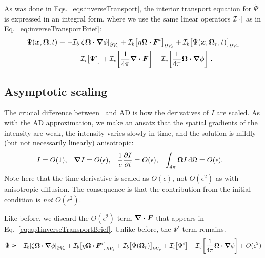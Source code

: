 As was done in Eqs.~\eqref{eqs:inverseTransport}, the interior transport
equation for $\tilde\Psi$ is expressed in an integral form, where we use the
same linear operators $\mathcal{I}_{}\!\left[\cdot\right]$ as in
Eq.~\eqref{eq:inverseTransportBrief}:
\begin{align}\label{eq:ap1inverseTransportBrief}
  \begin{split}
    \tilde\Psi(\bm{x}, \bm{\Omega}, t)
    &\equiv
    -\mathcal{I}_{b}\!\left[\zeta \bm{\Omega}\bm{\cdot} \bm{\nabla} \phi\right]_{\partial V_b}
    +\mathcal{I}_{b}\!\left[\eta \bm{\Omega}\bm{\cdot} \bm{F}^i\right]_{\partial V_b}
    + \mathcal{I}_{b}\!\left[\tilde\Psi(\bm{x}, \bm{\Omega}_r, t)\right]_{\partial V_r}
  \\&\qquad
    + \mathcal{I}_{i}\!\left[\Psi^i\right]
    + \mathcal{I}_{v}\!\left[\frac{1}{4\pi} \bm{\nabla} \bm{\cdot}\bm{F} \right]
    - \mathcal{I}_{v}\!\left[\frac{1}{4\pi} \bm{\Omega}\bm{\cdot} \bm{\nabla} \phi\right]
    \,.
  \end{split}
\end{align}

\subsection{Asymptotic scaling}

The crucial difference between \APone\ and AD is how the derivatives of $I$ are
scaled.
As with the AD approximation, we make an ansatz that the spatial gradients of
the intensity are weak, the intensity varies slowly in time, and the solution is
mildly (but not necessarily linearly) anisotropic:
\begin{align} \label{eq:ap1ansatz}
  I &= O(1), &
  \bm{\nabla} I &= O(\epsilon), &
  \frac{1}{c}\frac{\partial I}{\partial t} &= O(\epsilon), &
  \int_{4\pi} \bm{\Omega} I\mathop{}\!\mathrm{d}\Omega &= O(\epsilon).
\end{align}
Note here that the time derivative is scaled as $O(\epsilon)$, not
$O(\epsilon^2)$ as with anisotropic diffusion. The consequence is that the
contribution from the initial condition is \emph{not} $O(\epsilon^2)$.

Like before, we discard the $O(\epsilon^2)$ term $\bm{\nabla} \bm{\cdot}\bm{F}$ that appears in
Eq.~\eqref{eq:ap1inverseTransportBrief}. Unlike before, the $\Psi^i$ term
remains.
\begin{equation} \label{eq:ap1approxPsi1}
  \tilde\Psi \approx 
  -\mathcal{I}_{b}\!\left[\zeta \bm{\Omega}\bm{\cdot} \bm{\nabla} \phi\right]_{\partial V_b}
  + \mathcal{I}_{b}\!\left[\eta \bm{\Omega}\bm{\cdot} \bm{F}^i\right]_{\partial V_b}
  + \mathcal{I}_{b}\!\left[\tilde\Psi(\bm{\Omega}_r)\right]_{\partial V_r}
  + \mathcal{I}_{i}\!\left[\Psi^i\right]
  - \mathcal{I}_{v}\!\left[\frac{1}{4\pi} \bm{\Omega}\bm{\cdot} \bm{\nabla} \phi\right]
  + O(\epsilon^2)
\end{equation}

